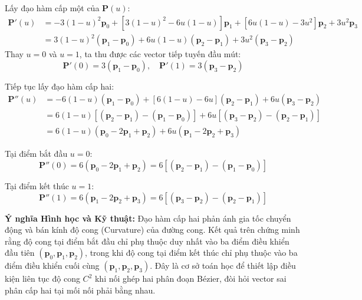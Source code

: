 Lấy đạo hàm cấp một của $\mathbf{P}(u)$:
\begin{align}
\mathbf{P}'(u) &= -3(1 - u)^2 \mathbf{p}_0 + [3(1 - u)^2 - 6u(1 - u)] \mathbf{p}_1 + [6u(1 - u) - 3u^2] \mathbf{p}_2 + 3u^2 \mathbf{p}_3 \nonumber \\
&= 3(1 - u)^2 (\mathbf{p}_1 - \mathbf{p}_0) + 6u(1 - u)(\mathbf{p}_2 - \mathbf{p}_1) + 3u^2 (\mathbf{p}_3 - \mathbf{p}_2)
\end{align}
Thay $u = 0$ và $u = 1$, ta thu được các vector tiếp tuyến đầu mút:
\begin{equation}
\mathbf{P}'(0) = 3(\mathbf{p}_1 - \mathbf{p}_0), \quad \mathbf{P}'(1) = 3(\mathbf{p}_3 - \mathbf{p}_2)
\end{equation}

Tiếp tục lấy đạo hàm cấp hai:
\begin{align}
\mathbf{P}''(u) &= -6(1 - u)(\mathbf{p}_1 - \mathbf{p}_0) + [6(1 - u) - 6u](\mathbf{p}_2 - \mathbf{p}_1) + 6u(\mathbf{p}_3 - \mathbf{p}_2) \nonumber \\
&= 6(1 - u)[(\mathbf{p}_2 - \mathbf{p}_1) - (\mathbf{p}_1 - \mathbf{p}_0)] + 6u[(\mathbf{p}_3 - \mathbf{p}_2) - (\mathbf{p}_2 - \mathbf{p}_1)] \nonumber \\
&= 6(1 - u)(\mathbf{p}_0 - 2\mathbf{p}_1 + \mathbf{p}_2) + 6u(\mathbf{p}_1 - 2\mathbf{p}_2 + \mathbf{p}_3)
\end{align}

Tại điểm bắt đầu $u = 0$:
\begin{equation}
\mathbf{P}''(0) = 6(\mathbf{p}_0 - 2\mathbf{p}_1 + \mathbf{p}_2) = 6[(\mathbf{p}_2 - \mathbf{p}_1) - (\mathbf{p}_1 - \mathbf{p}_0)]
\end{equation}

Tại điểm kết thúc $u = 1$:
\begin{equation}
\mathbf{P}''(1) = 6(\mathbf{p}_1 - 2\mathbf{p}_2 + \mathbf{p}_3) = 6[(\mathbf{p}_3 - \mathbf{p}_2) - (\mathbf{p}_2 - \mathbf{p}_1)]
\end{equation}

\textbf{Ý nghĩa Hình học và Kỹ thuật:}
Đạo hàm cấp hai phản ánh gia tốc chuyển động và bán kính độ cong (Curvature) của đường cong. Kết quả trên chứng minh rằng độ cong tại điểm bắt đầu chỉ phụ thuộc duy nhất vào ba điểm điều khiển đầu tiên $(\mathbf{p}_0, \mathbf{p}_1, \mathbf{p}_2)$, trong khi độ cong tại điểm kết thúc chỉ phụ thuộc vào ba điểm điều khiển cuối cùng $(\mathbf{p}_1, \mathbf{p}_2, \mathbf{p}_3)$. Đây là cơ sở toán học để thiết lập điều kiện liên tục độ cong $C^2$ khi nối ghép hai phân đoạn Bézier, đòi hỏi vector sai phân cấp hai tại mối nối phải bằng nhau.

